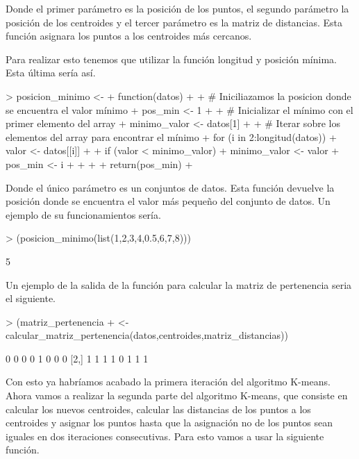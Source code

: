 \documentclass[parskip=full]{scrartcl}
\begin{document}
\begin{itemize}
    Donde el primer parámetro es la posición de los puntos, el segundo parámetro la posición de los centroides y el tercer parámetro es la matriz de distancias. Esta función asignara los puntos a los centroides más cercanos.

    Para realizar esto tenemos que utilizar la función longitud y posición mínima. Esta última sería así.


\begin{Schunk}
\begin{Sinput}
> posicion_minimo <-
+ function(datos){
+ 
+ # Iniciliazamos la posicion donde se encuentra el valor mínimo
+ pos_min <- 1
+ 
+ # Inicializar el mínimo con el primer elemento del array
+ minimo_valor <- datos[1]
+ 
+ # Iterar sobre los elementos del array para encontrar el mínimo
+ for (i in 2:longitud(datos)) {
+ valor <- datos[[i]]
+ 
+ if (valor < minimo_valor) {
+     minimo_valor <- valor
+     pos_min <- i
+ }
+ }
+ 
+ return(pos_min)
+ }
\end{Sinput}
\end{Schunk}


    Donde el único parámetro es un conjuntos de datos. Esta función devuelve la posición donde se encuentra el valor más pequeño del conjunto de datos. Un ejemplo de su funcionamientos sería.


\begin{Schunk}
\begin{Sinput}
>     (posicion_minimo(list(1,2,3,4,0.5,6,7,8)))
\end{Sinput}
\begin{Soutput}
[1] 5
\end{Soutput}
\end{Schunk}


    Un ejemplo de la salida de la función para calcular la matriz de pertenencia seria el siguiente.


\begin{Schunk}
\begin{Sinput}
>     (matriz_pertenencia 
+     <- calcular_matriz_pertenencia(datos,centroides,matriz_distancias))
\end{Sinput}
\begin{Soutput}
     [,1] [,2] [,3] [,4] [,5] [,6] [,7] [,8]
[1,]    0    0    0    0    1    0    0    0
[2,]    1    1    1    1    0    1    1    1
\end{Soutput}
\end{Schunk}


    Con esto ya habríamos acabado la primera iteración del algoritmo K-means. Ahora vamos a realizar la segunda parte del algoritmo K-means, que consiste en calcular los nuevos centroides, calcular las distancias de los puntos a los centroides y asignar los puntos hasta que la asignación no de los puntos sean iguales en dos iteraciones consecutivas. Para esto vamos a usar la siguiente función.



\end{itemize}
\end{document}
